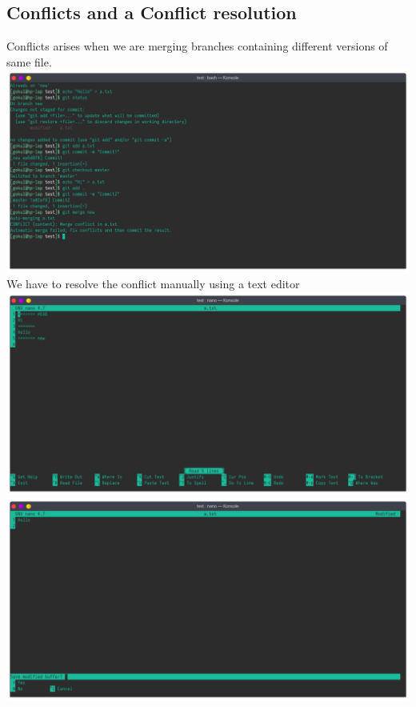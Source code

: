 \documentclass{article}
\begin{document}
\subsection{Conflicts and a Conflict resolution}
Conflicts arises when we are merging branches containing different versions of
same file.\newline
\includegraphics[width=1.2\textwidth]{img/p27/ss3.png}
\newline
We have to resolve the conflict manually using a text editor\newline
\includegraphics[width=1.2\textwidth]{img/p27/ss4.png}
\includegraphics[width=1.2\textwidth]{img/p27/ss5.png}
\end{document}
